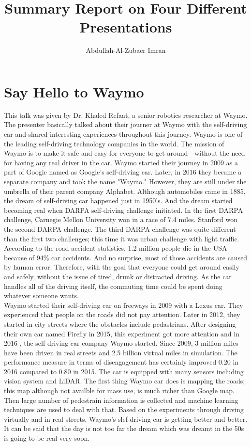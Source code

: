 \documentclass{report}
\title{Summary Report on Four Different Presentations}
\author{Abdullah-Al-Zubaer Imran}
\date{}
\begin{document}
\maketitle

\section{Say Hello to Waymo}
This talk was given by Dr. Khaled Refaat, a senior robotics researcher at Waymo. The presenter basically talked about their journer at Waymo with the self-driving car and shared interesting experiences throughout this journey. Waymo is one of the leading self-driving technology companies in the world. The mission of Waymo is to make it safe and easy for everyone to get around—without the need for having any real driver in the car. Waymo started their journey in 2009 as a part of Google named as Google's self-driving car. Later, in 2016 they became a separate company and took the name "Waymo." However, they are still under the umbrella of their parent company Alphabet. Although automobiles came in 1885, the dream of self-driving car happened just in 1950's. And the dream started becoming real when DARPA self-driving challenge initiated. In the first DARPA challenge, Carnegie Mellon University won in a race of 7.4 miles. Stanford won the second DARPA challenge. The third DARPA challenge was quite different than the first two challenges; this time it was urban challenge with light traffic. According to the road accident statistics, 1.2 million people die in the USA because of 94\% car accidents. And no surprise, most of those accidents are caused by human error. Therefore, with the goal that everyone could get around easily and safely, without the issue of tired, drunk or distracted driving. As the car handles all of the driving itself, the commuting time could be spent doing whatever someone wants.\\

Waymo started their self-driving car on freeways in 2009 with a Lexus car. They experienced that people on the roads did not pay attention. Later in 2012, they started in city streets where the obstacles include pedastrians. After designing their own car named Firefly in 2015, this experiment got more attention and in 2016 , the self-driving car company Waymo started. Since 2009, 3 million miles have been driven in real streets and 2.5 billion virtual miles in simulation. The performance measure in terms of disengagement has certainly improved 0.20 in 2016 compared to 0.80 in 2015. The car is equipped with many sensors including vision system and LiDAR. The first thing Waymo car does is mapping the roads; this map although not availble for mass use, is much richer than Google map. Then large number of pedestrain information is collected and machine learning techniques are used to deal with that. Based on the experiments through driving virtually and in real streets, Waymo's slef-driving car is getting better and better. It can be said that the day is not too far the dream which was dreamt in the 50s is going to be real very soon.         
\end{document}
